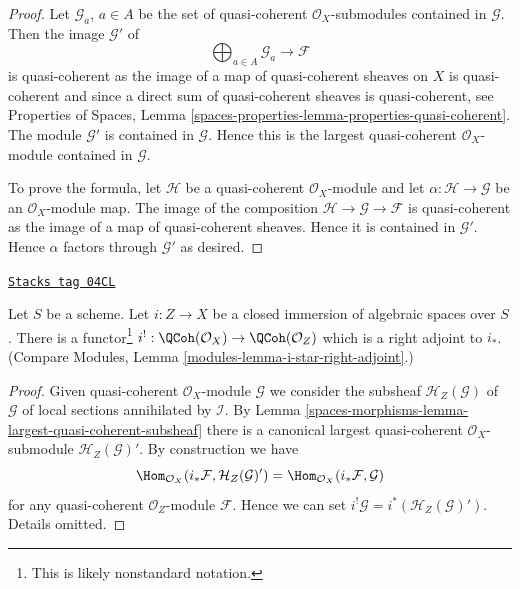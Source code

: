 \begin{proof}
Let $\mathcal{G}_a$, $a \in A$ be the set of quasi-coherent
$\mathcal{O}_X$-submodules contained in $\mathcal{G}$.
Then the image $\mathcal{G}'$ of
$$
\bigoplus\nolimits_{a \in A} \mathcal{G}_a \longrightarrow \mathcal{F}
$$
is quasi-coherent as the image of a map of quasi-coherent sheaves
on $X$ is quasi-coherent and since a direct sum of quasi-coherent sheaves
is quasi-coherent, see
Properties of Spaces,
Lemma \ref{spaces-properties-lemma-properties-quasi-coherent}.
The module $\mathcal{G}'$ is contained in $\mathcal{G}$. Hence this is the
largest quasi-coherent $\mathcal{O}_X$-module contained in $\mathcal{G}$.

\medskip\noindent
To prove the formula, let $\mathcal{H}$ be a quasi-coherent
$\mathcal{O}_X$-module and let $\alpha : \mathcal{H} \to \mathcal{G}$
be an $\mathcal{O}_X$-module map. The image of the composition
$\mathcal{H} \to \mathcal{G} \to \mathcal{F}$ is quasi-coherent
as the image of a map of quasi-coherent sheaves. Hence it is contained
in $\mathcal{G}'$. Hence $\alpha$ factors through $\mathcal{G}'$
as desired.
\end{proof}

\begin{lemma}
\label{spaces-morphisms-lemma-i-upper-shriek}
\href{https://stacks.math.columbia.edu/tag/04CL}{\texttt{Stacks tag 04CL}}

Let $S$ be a scheme.
Let $i : Z \to X$ be a closed immersion of algebraic spaces over $S$.
There is a functor\footnote{This is likely nonstandard notation.}
$i^! : \QCoh(\mathcal{O}_X) \to \QCoh(\mathcal{O}_Z)$
which is a right adjoint to $i_*$. (Compare
Modules, Lemma \ref{modules-lemma-i-star-right-adjoint}.)
\end{lemma}

\begin{proof}
Given quasi-coherent $\mathcal{O}_X$-module $\mathcal{G}$ we consider
the subsheaf $\mathcal{H}_Z(\mathcal{G})$ of $\mathcal{G}$ of local sections
annihilated by $\mathcal{I}$. By
Lemma \ref{spaces-morphisms-lemma-largest-quasi-coherent-subsheaf}
there is a canonical largest quasi-coherent $\mathcal{O}_X$-submodule
$\mathcal{H}_Z(\mathcal{G})'$. By construction we have
$$
\Hom_{\mathcal{O}_X}(i_*\mathcal{F}, \mathcal{H}_Z(\mathcal{G})')
=
\Hom_{\mathcal{O}_X}(i_*\mathcal{F}, \mathcal{G})
$$
for any quasi-coherent $\mathcal{O}_Z$-module $\mathcal{F}$.
Hence we can set $i^!\mathcal{G} = i^*(\mathcal{H}_Z(\mathcal{G})')$.
Details omitted.
\end{proof}

